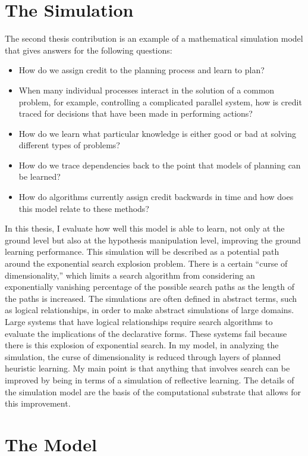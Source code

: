 \section{The Simulation}

The second thesis contribution is an example of a mathematical
simulation model that gives answers for the following questions:
\begin{itemize}
\item How do we assign credit to the planning process and learn to
  plan?
\item When many individual processes interact in the solution of a
  common problem, for example, controlling a complicated parallel
  system, how is credit traced for decisions that have been made in
  performing actions?
\item How do we learn what particular knowledge is either good or bad
  at solving different types of problems?
\item How do we trace dependencies back to the point that models of
  planning can be learned?
\item How do algorithms currently assign credit backwards in time and
  how does this model relate to these methods?
\end{itemize}

In this thesis, I evaluate how well this model is able to learn, not
only at the ground level but also at the hypothesis manipulation
level, improving the ground learning performance.  This simulation
will be described as a potential path around the exponential search
explosion problem.  There is a certain ``curse of dimensionality,''
which limits a search algorithm from considering an exponentially
vanishing percentage of the possible search paths as the length of the
paths is increased.  The simulations are often defined in abstract
terms, such as logical relationships, in order to make abstract
simulations of large domains.  Large systems that have logical
relationships require search algorithms to evaluate the implications
of the declarative forms.  These systems fail because there is this
explosion of exponential search.  In my model, in analyzing the
simulation, the curse of dimensionality is reduced through layers of
planned heuristic learning.  My main point is that anything that
involves search can be improved by being in terms of a simulation of
reflective learning.  The details of the simulation model are the
basis of the computational substrate that allows for this improvement.

\section{The Model}

